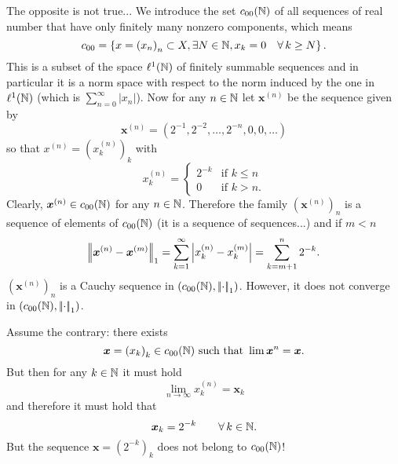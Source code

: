 \documentclass{article}
\begin{document}
The opposite is not true... We introduce the set $c_{00}(\mathbb{N})$ of all sequences of real number that have only finitely many nonzero components, which means
\begin{equation*}
	c_{00}=\left\{x={(x_{n})}_{n}\subset X,\exists N\in\mathbb{N},x_{k}=0\quad\forall\, k\geq N\right\}.
\end{equation*}
This is a subset of the space $\ell^{1}(\mathbb{N})$ of finitely summable  sequences and in particular it is a norm space with respect to the norm induced by the one in $\ell^{1}(\mathbb{N})$ (which is $\sum_{n=0}^{\infty}|x_{n}|$). Now for any $n\in\mathbb{N}$ let $\bm{x}^{(n)}$ be the sequence given by
\begin{equation*}
	\bm{x}^{(n)}=(2^{-1},2^{-2},\ldots,2^{-n},0,0,\ldots)
\end{equation*}
so that $x^{(n)}={\left(x_{k}^{(n)}\right)}_{k}$ with \begin{equation*}
	x_{k}^{(n)}=\begin{cases}
		2^{-k}&\text{if }k\leq n\\
		0&\text{if }k>n.
	\end{cases}
\end{equation*}
Clearly, $\bm{x}^{(n)}\in c_{00}(\mathbb{N})$ for any $n\in\mathbb{N}$. Therefore the family ${\left(\bm{x}^{(n)}\right)}_{n}$ is a sequence of elements of $c_{00}(\mathbb{N})$ (it is a sequence of sequences...) and if $m<n$
\begin{equation*}
	\left|\negthinspace\left|\bm{x}^{(n)}-\bm{x}^{(m)}\right|\negthinspace\right|_{1}=\sum_{k=1}^{\infty}\left|x_{k}^{(n)}-x_{k}^{(m)}\right|=\sum_{k=m+1}^{n}2^{-k}.
\end{equation*}
${\left(\bm{x}^{(n)}\right)}_{n}$ is a Cauchy sequence in $\left(c_{00}(\mathbb{N}),\left|\negthinspace\left|\cdot\right|\negthinspace\right|_{1}\right)$. However, it does not converge in $\left(c_{00}(\mathbb{N}),\left|\negthinspace\left|\cdot\right|\negthinspace\right|_{1}\right)$.
\begin{fancyproof}
	Assume the contrary: there exists 
	\begin{equation*}
		\bm{x}={\left(x_{k}\right)}_{k}\in c_{00}(\mathbb{N})\text{ such that }\lim\bm{x}^{n}=\bm{x}.
	\end{equation*}
	But then for any $k\in\mathbb{N}$ it must hold
	\begin{equation*}
		\lim_{n\to\infty}x_{k}^{(n)}=\bm{x}_{k}
	\end{equation*}
	and therefore it must hold that
	\begin{equation*}
		\bm{x}_{k}=2^{-k}\qquad\forall\, k\in\mathbb{N}.
	\end{equation*}
	But the sequence $\bm{x}={\left(2^{-k}\right)}_{k}$ does not belong to $c_{00}(\mathbb{N})$!
\end{fancyproof}
\end{document}
